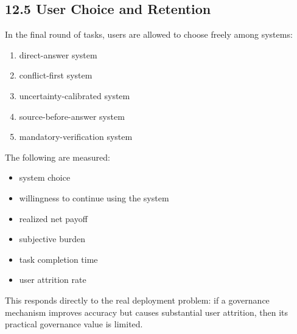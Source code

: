 \subsection*{12.5 User Choice and Retention}

In the final round of tasks, users are allowed to choose freely among systems:
\begin{enumerate}[leftmargin=1.8em]
\item direct-answer system
\item conflict-first system
\item uncertainty-calibrated system
\item source-before-answer system
\item mandatory-verification system
\end{enumerate}

The following are measured:
\begin{itemize}[leftmargin=1.5em]
\item system choice
\item willingness to continue using the system
\item realized net payoff
\item subjective burden
\item task completion time
\item user attrition rate
\end{itemize}

This responds directly to the real deployment problem: if a governance mechanism improves accuracy but causes substantial user attrition, then its practical governance value is limited.
